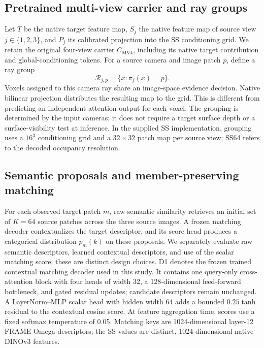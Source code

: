 \documentclass[10pt]{article}
\begin{document}
\subsection{Pretrained multi-view carrier and ray groups}
Let $T$ be the native target feature map, $S_j$ the native feature map of source
view $j\in\{1,2,3\}$, and $P_j$ its calibrated projection into the SS conditioning
grid. We retain the original four-view carrier $C_{\mathrm{MV4}}$, including
its native target contribution and global-conditioning tokens. For a source
camera and image patch $p$, define a ray group
\begin{equation}
 \mathcal R_{j,p}=\{x:\pi_j(x)=p\}.
\end{equation}
Voxels assigned to this camera ray share an image-space evidence decision.
Native bilinear projection distributes the resulting map to the grid. This is
different from predicting an independent attention output for each voxel.
The grouping is determined by the input cameras; it does not require a target
surface depth or a surface-visibility test at inference.
In the supplied SS implementation, grouping uses a $16^3$ conditioning grid
and a $32\times32$ patch map per source view; SS64 refers to the decoded
occupancy resolution.

\subsection{Semantic proposals and member-preserving matching}
For each observed target patch $m$, raw semantic similarity retrieves an
initial set of $K=64$ source patches across the three source images. A frozen
matching decoder contextualizes the target descriptor, and its score head
produces a categorical distribution $p_m(k)$ on these proposals. We separately
evaluate raw semantic descriptors, learned contextual descriptors, and use of
the scalar matching score; these are distinct design choices.
D1 denotes the frozen trained contextual matching decoder used in this study.
It contains one query-only cross-attention block with four heads of width 32,
a 128-dimensional feed-forward bottleneck, and gated residual updates;
candidate descriptors remain unchanged. A LayerNorm--MLP scalar head with
hidden width 64 adds a bounded $0.25\tanh$ residual to the contextual cosine
score. At feature aggregation time, scores use a fixed softmax temperature
of 0.05. Matching keys are 1024-dimensional layer-12 FRAME Omega descriptors;
the SS values are distinct, 1024-dimensional native DINOv3 features.
\end{document}
